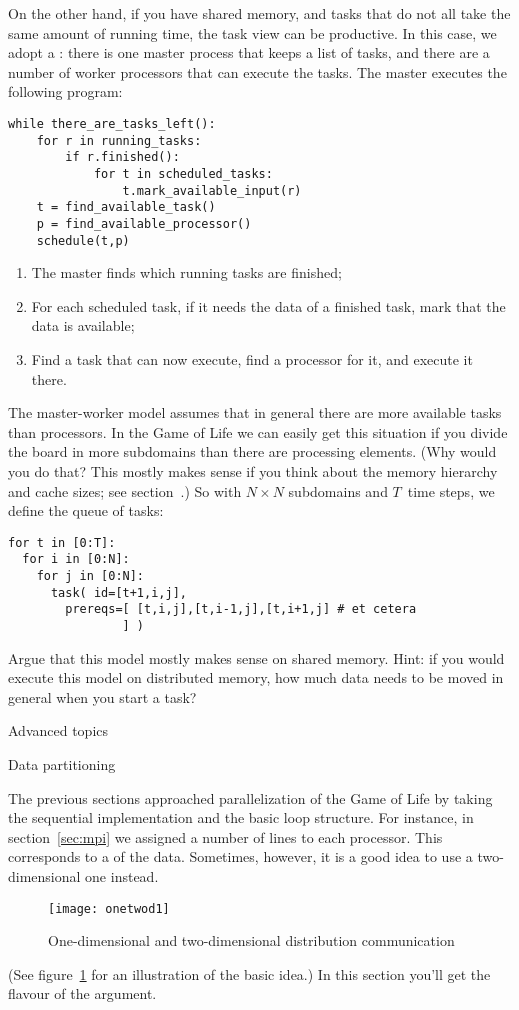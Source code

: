 On the other hand, if you have shared memory, and tasks that do not
all take the same amount of running time, the task view can be
productive. In this case, we adopt a :
there is one master process that keeps a list of tasks, and there are
a number of worker processors that can execute the tasks. The master executes
the following program:
\begin{verbatim}
while there_are_tasks_left():
    for r in running_tasks:
        if r.finished():
            for t in scheduled_tasks:
                t.mark_available_input(r)
    t = find_available_task()
    p = find_available_processor()
    schedule(t,p)
\end{verbatim}
\begin{enumerate}
\item The master finds which running tasks are finished;
\item For each scheduled task, if it needs the data of a finished
  task, mark that the data is available;
\item Find a task that can now execute, find a processor for it, and
  execute it there.
\end{enumerate}

The master-worker model assumes that in general there are more
available tasks than processors. In the Game of Life we can easily get
this situation if you divide the board in more subdomains than there
are processing elements. (Why would you do that? This mostly makes
sense if you think about the memory hierarchy and cache sizes; see
section~.) So with
$N\times N$ subdomains and $T$~time steps, we define the queue
of tasks:
\begin{verbatim}
for t in [0:T]:
  for i in [0:N]:
    for j in [0:N]:
      task( id=[t+1,i,j], 
        prereqs=[ [t,i,j],[t,i-1,j],[t,i+1,j] # et cetera
                ] )
\end{verbatim}

\begin{exercise}
  Argue that this model mostly makes sense on shared memory. Hint: if
  you would execute this model on distributed memory, how much data
  needs to be moved in general when you start a task?
\end{exercise}

 {Advanced topics}

 {Data partitioning}
\label{sec:distribution}

The previous sections approached parallelization of the
Game of Life by taking the sequential implementation
and the basic loop structure. For instance, in
section~\ref{sec:mpi} we assigned a number of lines to each 
processor. This corresponds to a 
of the data.
Sometimes, however, it is a good idea to use a two-dimensional
one instead.
\begin{figure}[ht]
  \texttt{[image: onetwod1]}
  \caption{One-dimensional and two-dimensional distribution communication}
  \label{fig:onetwod1}
\end{figure}
(See figure~\ref{fig:onetwod1} for an illustration 
of the basic idea.) In this section you'll get the
flavour of the argument.

